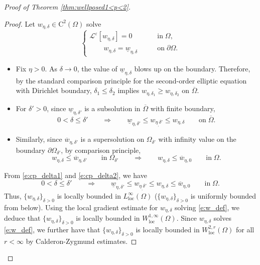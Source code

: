 \documentclass[12pt,reqno]{amsart}
\numberwithin{figure}{section}
\theoremstyle{plain}
\theoremstyle{remark}
\numberwithin{equation}{section}
\begin{document}
\begin{proof} [Proof of Theorem \ref{thm:wellposed1<p<2}]
\begin{proof} Let $w_{\eta,\delta}\in \mathrm{C}^2(\Omega)$ solve
    \begin{equation}\label{e:w_def}
    \begin{cases}
        \mathcal{L}^\varepsilon\left[w_{\eta,\delta}\right] = 0 &\qquad\text{in}\;\Omega,\\
        \qquad w_{\eta,\delta} = \underline{w}_{\eta,\delta} &\qquad\text{on}\;\partial\Omega.
    \end{cases}
    \end{equation}
    \begin{itemize}
        \item Fix $\eta>0$. As $\delta\to 0$, the value of $\underline{w}_{\eta,\delta}$ blows up on the boundary. Therefore, by the standard comparison principle for the second-order elliptic equation with Dirichlet boundary, $\delta_1 \leq  \delta_2$ implies $w_{\eta,\delta_1}\geq  w_{\eta,\delta_2}$ on $\overline{\Omega}$. 
        \item For $\delta'>0$, since $\underline{w}_{\eta,\delta'}$ is a subsolution in $\overline{\Omega}$ with finite boundary, 
            \begin{equation}\label{e:cp_delta1}
                0<\delta \leq \delta'\qquad\Longrightarrow\qquad \underline{w}_{\eta,\delta'} \leq w_{\eta_,\delta'}\leq w_{\eta,\delta} \qquad\text{on}\;\overline{\Omega}.
            \end{equation}
        \item Similarly, since $\overline{w}_{\eta,\delta'}$ is a supersolution on $\Omega_{\delta'}$ with infinity value on the boundary $\partial\Omega_{\delta'}$, by comparison principle,
            \begin{equation}\label{e:cp_delta2}
                w_{\eta,\delta} \leq \overline{w}_{\eta, \delta'} \qquad\text{in}\;\Omega_{\delta'} \qquad\Longrightarrow\qquad w_{\eta,\delta} \leq \overline{w}_{\eta,0} \qquad\text{in}\;\Omega.
            \end{equation}
    \end{itemize}
    \noindent From \eqref{e:cp_delta1} and \eqref{e:cp_delta2}, we have
    \begin{equation}\label{e:cp_delta3}
        0<\delta \leq \delta'\qquad\Longrightarrow\qquad \underline{w}_{\eta,\delta'} \leq w_{\eta_,\delta'}\leq w_{\eta,\delta} \leq \overline{w}_{\eta,0} \qquad\text{in}\;\Omega.
    \end{equation}
    Thus, $\{w_{\eta,\delta}\}_{\delta>0}$ is locally bounded in $L^{\infty}_{\mathrm{loc}}(\Omega)$ ($\{w_{\eta,\delta}\}_{\delta>0}$ is uniformly bounded from below). Using the local gradient estimate for $w_{\eta,\delta}$ solving \eqref{e:w_def}, we deduce that $\{w_{\eta,\delta}\}_{\delta>0}$ is locally bounded in $W^{1,\infty}_{\mathrm{loc}}(\Omega)$. Since $w_{\eta,\delta}$ solves \eqref{e:w_def}, we further have that $\{w_{\eta,\delta}\}_{\delta>0}$ is locally bounded in $W^{2,r}_{\mathrm{loc}}(\Omega)$ for all $r<\infty$ by Calderon-Zygmund estimates.
    

\end{proof}
\end{proof}
\end{document}
